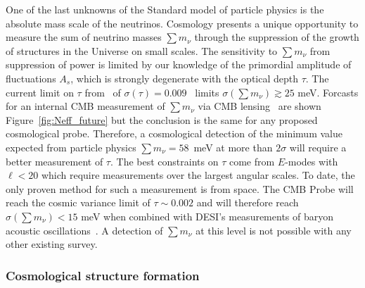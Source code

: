One of the last unknowns of the Standard model of particle physics is the absolute mass scale of the neutrinos.  
Cosmology presents a unique opportunity to measure the sum of neutrino masses $\sum m_\nu$ through the 
suppression of the growth of structures in the Universe on small scales.  
The sensitivity to $\sum m_\nu$ from suppression of power is limited by our knowledge of 
the primordial amplitude of fluctuations $A_s$, which is strongly degenerate with the optical depth $\tau$.  
The current limit on $\tau$ from \planck\ of $\sigma({\tau}) = 0.009$~\cite{} limits 
$\sigma(\sum m_\nu) \gtrsim 25$ meV. Forcasts for an internal 
CMB measurement of $\sum m_\nu$ via CMB lensing~\cite{Kaplinghat:2003bh} are shown Figure~\ref{fig:Neff_future} but the conclusion is the same for any proposed cosmological probe.
Therefore, a cosmological detection of the minimum value expected from particle physics  
$\sum m_\nu = 58$~meV at more than $2 \sigma$ will require a better measurement of $\tau$.  
The best constraints on $\tau$ come from $E$-modes with $\ell < 20$ which require 
measurements over the largest angular scales.
To date, the only proven method for such a measurement is from space.  
The \ac{CMB} Probe will reach the cosmic variance limit of $\tau \sim 0.002$ and will therefore 
reach $\sigma(\sum m_\nu) < 15$ meV when combined with DESI's measurements of 
baryon acoustic oscillations~\cite{Levi:2013gra}.  
A detection of $\sum m_\nu$ at this level is not possible with any other existing survey.

\vspace{-0.15in}

\subsubsection{Cosmological structure formation}

